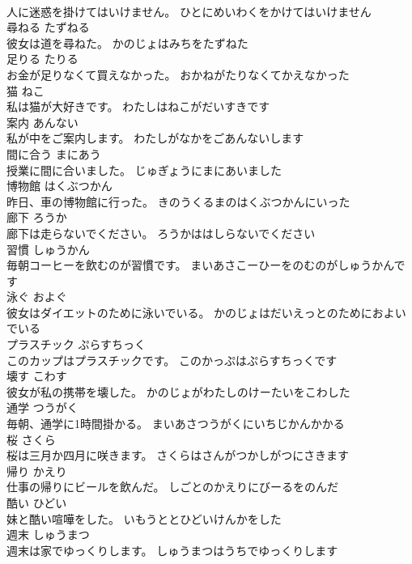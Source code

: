 \documentclass[8pt]{extreport}
\begin{document}
\begin{CJK}{UTF8}{min}
\\	人に迷惑を掛けてはいけません。	ひとにめいわくをかけてはいけません	
\\	尋ねる	たずねる	
\\	彼女は道を尋ねた。	かのじょはみちをたずねた	
\\	足りる	たりる	
\\	お金が足りなくて買えなかった。	おかねがたりなくてかえなかった	
\\	猫	ねこ	
\\	私は猫が大好きです。	わたしはねこがだいすきです	
\\	案内	あんない	
\\	私が中をご案内します。	わたしがなかをごあんないします	
\\	間に合う	まにあう	
\\	授業に間に合いました。	じゅぎょうにまにあいました	
\\	博物館	はくぶつかん	
\\	昨日、車の博物館に行った。	きのうくるまのはくぶつかんにいった	
\\	廊下	ろうか	
\\	廊下は走らないでください。	ろうかははしらないでください	
\\	習慣	しゅうかん	
\\	毎朝コーヒーを飲むのが習慣です。	まいあさこーひーをのむのがしゅうかんです	
\\	泳ぐ	およぐ	
\\	彼女はダイエットのために泳いでいる。	かのじょはだいえっとのためにおよいでいる	
\\	プラスチック	ぷらすちっく	
\\	このカップはプラスチックです。	このかっぷはぷらすちっくです	
\\	壊す	こわす	
\\	彼女が私の携帯を壊した。	かのじょがわたしのけーたいをこわした	
\\	通学	つうがく	
\\	毎朝、通学に1時間掛かる。	まいあさつうがくにいちじかんかかる	
\\	桜	さくら	
\\	桜は三月か四月に咲きます。	さくらはさんがつかしがつにさきます	
\\	帰り	かえり	
\\	仕事の帰りにビールを飲んだ。	しごとのかえりにびーるをのんだ	
\\	酷い	ひどい	
\\	妹と酷い喧嘩をした。	いもうととひどいけんかをした	
\\	週末	しゅうまつ	
\\	週末は家でゆっくりします。	しゅうまつはうちでゆっくりします	

\end{CJK}
\end{document}
